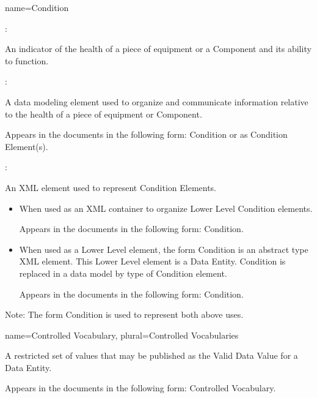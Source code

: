{
  name={Condition}
}
{
	:

	An indicator of the health of a piece of equipment or a Component and its ability to function.

	:

	A data modeling element used to organize and communicate information relative to the health of a piece of equipment or Component.

	Appears in the documents in the following form: Condition or as Condition Element(s).

	:

	An XML element used to represent Condition Elements.

    \begin{itemize}
	\item When used as an XML container to organize Lower Level Condition elements.

	Appears in the documents in the following form: Condition.

	\item When used as a Lower Level element, the form Condition is an abstract type XML element.  This Lower Level element is a Data Entity.  Condition is replaced in a data model by type of Condition element.

	Appears in the documents in the following form: Condition.
	\end{itemize}

	Note: The form Condition is used to represent both above uses.
}


{
  name={Controlled Vocabulary},
  plural={Controlled Vocabularies}
}
{
	A restricted set of values that may be published as the Valid Data Value for a Data Entity.

	Appears in the documents in the following form: Controlled Vocabulary.
}



